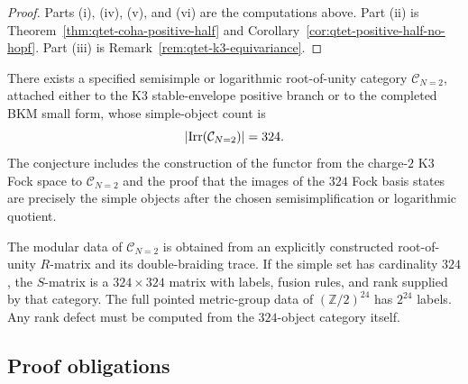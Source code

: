 \begin{proof}
Parts (i), (iv), (v), and (vi) are the computations above.  Part (ii)
is Theorem~\ref{thm:qtet-coha-positive-half} and
Corollary~\ref{cor:qtet-positive-half-no-hopf}.  Part (iii) is
Remark~\ref{rem:qtet-k3-equivariance}.
\end{proof}

\begin{conjecture}
\label{conj:qtet-root-unity-simples}
There exists a specified semisimple or logarithmic root-of-unity
category \(\mathcal C_{N=2}\), attached either to the K3
stable-envelope positive branch or to the completed BKM small form,
whose simple-object count is
\[
  |\mathrm{Irr}(\mathcal C_{N=2})|=324.
\]
The conjecture includes the construction of the functor from the
charge-\(2\) K3 Fock space to \(\mathcal C_{N=2}\) and the proof that
the images of the \(324\) Fock basis states are precisely the simple
objects after the chosen semisimplification or logarithmic quotient.
\end{conjecture}

\begin{conjecture}
\label{conj:qtet-root-unity-modular-data}
The modular data of \(\mathcal C_{N=2}\) is obtained from an explicitly
constructed root-of-unity \(R\)-matrix and its double-braiding trace.
If the simple set has cardinality \(324\), the \(S\)-matrix is a
\(324\times324\) matrix with labels, fusion rules, and rank supplied by
that category.  The full pointed metric-group data of
\((\mathbb Z/2)^{24}\) has \(2^{24}\) labels.  Any rank defect must be
computed from the \(324\)-object category itself.
\end{conjecture}

\subsection{Proof obligations}
\label{subsec:qtet-proof-obligations}

